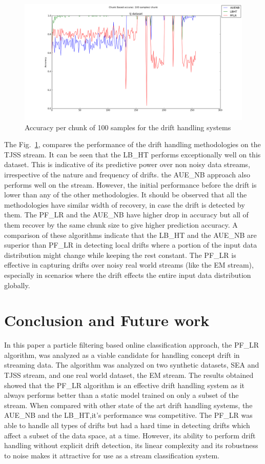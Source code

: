 \documentclass[conference]{IEEEtran}
\begin{document}
\begin{figure}
\captionsetup{justification=centering}
\centering
\includegraphics[scale=0.22]{fig/chunk_100_drifthandlers.png}
\caption{Accuracy per chunk of 100 samples for the drift handling systems}
\label{fig:chunk_dh_100} 
\end{figure}

The Fig.~\ref{fig:chunk_dh_100}, compares the performance of the drift handling methodologies on the TJSS stream. It can be seen that the LB\_HT performs exceptionally well on this dataset. This is indicative of its predictive power over non noisy data streams, irrespective of the nature and frequency of drifts. the AUE\_NB approach also performs well on the stream. However, the initial performance before the drift is lower than any of the other methodologies. It should be observed that all the methodologies have similar width of recovery, in case the drift is detected by them. The PF\_LR and the AUE\_NB have higher drop in accuracy but all of them recover by the same chunk size to give higher prediction accuracy. A comparison of these algorithms indicate that the LB\_HT and the AUE\_NB are superior than PF\_LR in detecting local drifts where a portion of the input data distribution might change while keeping the rest constant. The PF\_LR is effective in capturing drifts over noisy real world streams (like the EM stream), especially in scenarios where the drift effects the entire input data distribution globally. 


\section{Conclusion and Future work}
In this paper a particle filtering based online classification approach, the PF\_LR algorithm, was analyzed as a viable candidate for handling concept drift in streaming data. The algorithm was analyzed on two synthetic datasets, SEA and TJSS stream, and one real world dataset, the EM stream. The results obtained showed that the PF\_LR algorithm is an effective drift handling system as it always performs better than a static model trained on only a subset of the stream. When compared with other state of the art drift handling systems, the AUE\_NB and the LB\_HT,it's performance was competitive. The PF\_LR was able to handle all types of drifts but had a hard time in detecting drifts which affect a subset of the data space, at a time. However, its ability to perform drift handling without explicit drift detection, its linear complexity and its robustness to noise makes it attractive for use as a stream classification system. 
\end{document}
